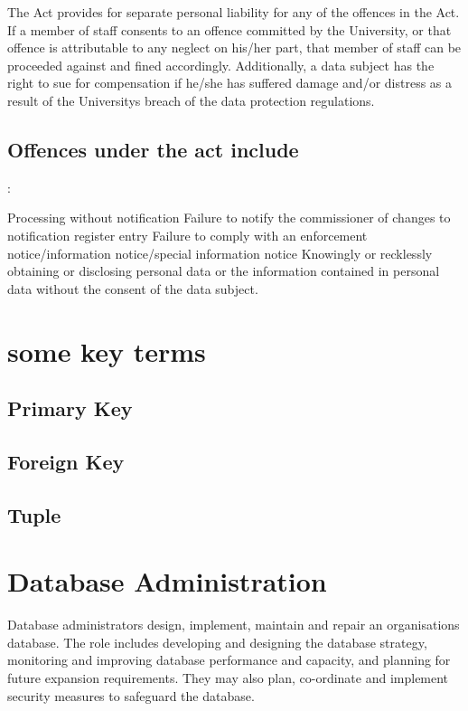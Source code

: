 \documentclass[12pt]{article}
\begin{document}
The Act provides for separate personal liability for any of the offences in the Act. If a member of staff consents to an offence committed by the University, or that offence is attributable to any neglect on his/her part, that member of staff can be proceeded against and fined accordingly. Additionally, a data subject has the right to sue for compensation if he/she has suffered damage and/or distress as a result of the Universitys breach of the data protection regulations.

\subsection{Offences under the act include}:

Processing without notification
Failure to notify the commissioner of changes to notification register entry
Failure to comply with an enforcement notice/information notice/special information notice
Knowingly or recklessly obtaining or disclosing personal data or the information contained in personal data without the consent of the data subject.


\newpage

\section{some key terms}
\subsection{Primary Key}
\subsection{Foreign Key}
\subsection{Tuple}

\section{Database Administration}
Database administrators design, implement, maintain and repair an organisations database. The role includes developing and designing the database strategy, monitoring and improving database performance and capacity, and planning for future expansion requirements. They may also plan, co-ordinate and implement security measures to safeguard the database.
\end{document}
